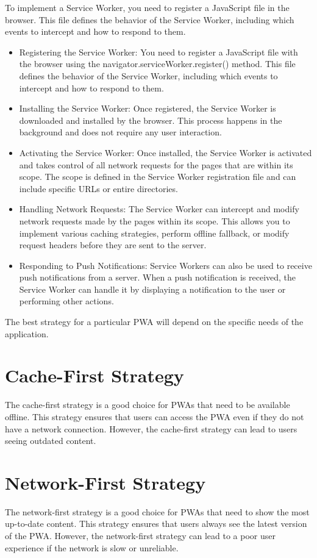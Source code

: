 \documentclass{report}
\begin{document}
To implement a Service Worker, you need to register a JavaScript file in the browser. This file defines the behavior of the Service Worker, including which events to intercept and how to respond to them.\cite{mozilla23}
\begin{itemize}
    \item Registering the Service Worker: You need to register a JavaScript file with the browser using the navigator.serviceWorker.register() method. This file defines the behavior of the Service Worker, including which events to intercept and how to respond to them.
    \item Installing the Service Worker: Once registered, the Service Worker is downloaded and installed by the browser. This process happens in the background and does not require any user interaction.
    \item Activating the Service Worker: Once installed, the Service Worker is activated and takes control of all network requests for the pages that are within its scope. The scope is defined in the Service Worker registration file and can include specific URLs or entire directories.
    \item Handling Network Requests: The Service Worker can intercept and modify network requests made by the pages within its scope. This allows you to implement various caching strategies, perform offline fallback, or modify request headers before they are sent to the server.
    \item Responding to Push Notifications: Service Workers can also be used to receive push notifications from a server. When a push notification is received, the Service Worker can handle it by displaying a notification to the user or performing other actions.
\end{itemize}
The best strategy for a particular PWA will depend on the specific needs of the application. \cite{jakearchibald14}

\section{Cache-First Strategy}\label{Cache-First Strategy}

The cache-first strategy is a good choice for PWAs that need to be available offline. This strategy ensures that users can access the PWA even if they do not have a network connection. However, the cache-first strategy can lead to users seeing outdated content.

\section{Network-First Strategy}\label{Network-First Strategy}
The network-first strategy is a good choice for PWAs that need to show the most up-to-date content. This strategy ensures that users always see the latest version of the PWA. However, the network-first strategy can lead to a poor user experience if the network is slow or unreliable.
\end{document}
